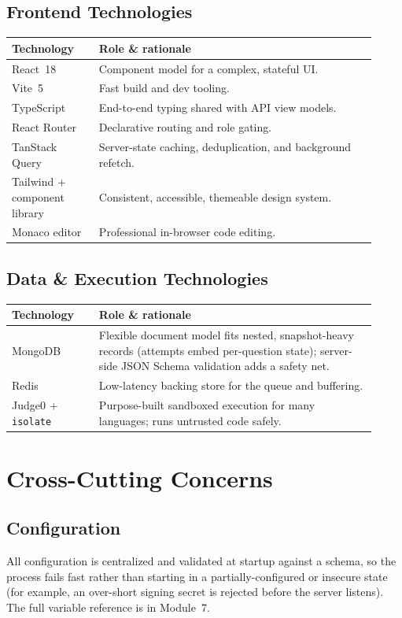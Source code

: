 \documentclass[12pt,a4paper,oneside]{report}
\newcommand{\code}[1]{\texttt{#1}}
\begin{document}
\section{Frontend Technologies}
\begin{longtable}{@{}p{0.22\linewidth} p{0.70\linewidth}@{}}
\toprule
\textbf{Technology} & \textbf{Role \& rationale}\\
\midrule
\endhead
React~18 & Component model for a complex, stateful UI.\\
Vite~5 & Fast build and dev tooling.\\
TypeScript & End-to-end typing shared with API view models.\\
React Router & Declarative routing and role gating.\\
TanStack Query & Server-state caching, deduplication, and background refetch.\\
Tailwind + component library & Consistent, accessible, themeable design system.\\
Monaco editor & Professional in-browser code editing.\\
\bottomrule
\end{longtable}

\section{Data \& Execution Technologies}
\begin{longtable}{@{}p{0.22\linewidth} p{0.70\linewidth}@{}}
\toprule
\textbf{Technology} & \textbf{Role \& rationale}\\
\midrule
\endhead
MongoDB & Flexible document model fits nested, snapshot-heavy records (attempts embed per-question state); server-side JSON Schema validation adds a safety net.\\
Redis & Low-latency backing store for the queue and buffering.\\
Judge0 + \code{isolate} & Purpose-built sandboxed execution for many languages; runs untrusted code safely.\\
\bottomrule
\end{longtable}

\chapter{Cross-Cutting Concerns}
\section{Configuration}
All configuration is centralized and validated at startup against a schema, so
the process fails fast rather than starting in a partially-configured or insecure
state (for example, an over-short signing secret is rejected before the server
listens). The full variable reference is in Module~7.
\end{document}
